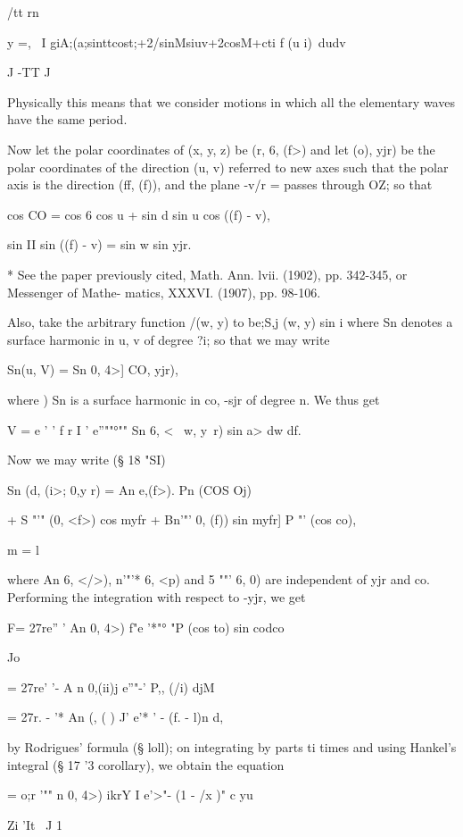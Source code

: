 /tt rn

y =, \ I giA;(a;sinttcost;+2/sinMsiuv+2cosM+cti f (u i)\ dudv

J -TT J

Physically this means that we consider motions in which all the
elementary waves have the same period.

Now let the polar coordinates of (x, y, z) be (r, 6, (f>) and let (o),
yjr) be the polar coordinates of the direction (u, v) referred to new
axes such that the polar axis is the direction (ff, (f)), and the
plane -v/r = passes through OZ; so that

cos CO = cos 6 cos u + sin d sin u cos ((f) - v),

sin II sin ((f) - v) = sin w sin yjr.

* See the paper previously cited, Math. Ann. lvii. (1902), pp.
342-345, or Messenger of Mathe- matics, XXXVI. (1907), pp. 98-106.

%
%

Also, take the arbitrary function /(w, y) to be;S,j (w, y) sin i
where Sn denotes a surface harmonic in u, v of degree ?i; so that we
may write

Sn(u, V) = Sn 0, 4>] CO, yjr),

where ) Sn is a surface harmonic in co, -sjr of degree n. We
thus get

V = e ' ' f r I ' e''""°"" Sn 6, < \ w, y\ r) sin a> dw df.

Now we may write (§ 18 "SI)

Sn (d, (i>; 0,y r) = An e,(f>). Pn (COS Oj)

+ S "'" (0, <f>) cos myfr + Bn'"' 0, (f)) sin myfr] P "' (cos co),

m = l

where An 6, </>), n'"'* 6, <p) and 5 ""' 6, 0) are independent of yjr
and co. Performing the integration with respect to -yjr, we get

F= 27re'' ' An 0, 4>) f"e '*"° "P (cos to) sin codco

Jo

= 27re' '- A n 0,(ii)j e''"-' P,, (/i) djM

= 27r. - '* An (, ( ) J' e'* ' - (f. - l)n d,

by Rodrigues' formula (§ loll); on integrating by parts ti times and
using Hankel's integral (§ 17 '3 corollary), we obtain the equation

 = o;r '"" n 0, 4>) ikrY I e'>"- (1 - /x )" c yu

Zi  'It \ J 1

